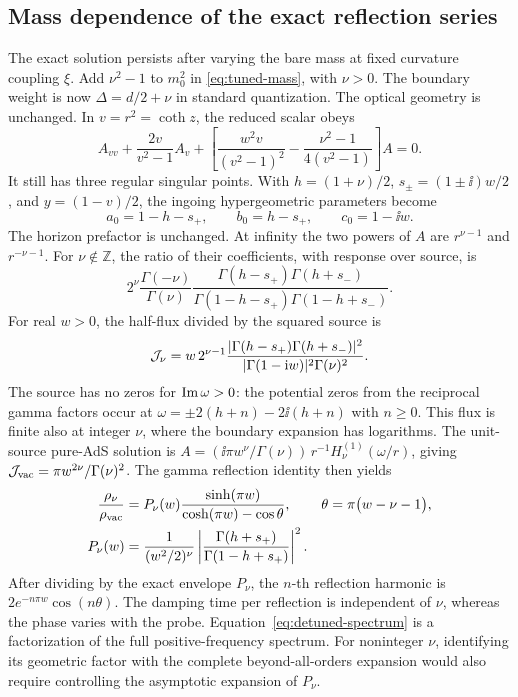 \subsection{Mass dependence of the exact reflection series}
\label{sec:detuning}

The exact solution persists after varying the bare mass at fixed curvature coupling \(\xi\). Add \(\nu^2-1\) to \(m_0^2\) in \eqref{eq:tuned-mass}, with \(\nu>0\). The boundary weight is now \(\Delta=d/2+\nu\) in standard quantization. The optical geometry is unchanged. In \(v=r^2=\coth z\), the reduced scalar obeys
\begin{equation}
 A_{vv}+\frac{2v}{v^2-1}A_v+
 \left[\frac{w^2 v}{(v^2-1)^2}-\frac{\nu^2-1}{4(v^2-1)}\right]A=0 .
 \label{eq:detune-v}
\end{equation}
It still has three regular singular points. With \(h=(1+\nu)/2\), \(s_\pm=(1\pm\ii)w/2\), and \(y=(1-v)/2\), the ingoing hypergeometric parameters become
\begin{equation}
 a_0=1-h-s_+,\qquad b_0=h-s_+,\qquad c_0=1-\ii w .
\end{equation}
The horizon prefactor is unchanged. At infinity the two powers of \(A\) are \(r^{\nu-1}\) and \(r^{-\nu-1}\). For \(\nu\notin\mathbb Z\), the ratio of their coefficients, with response over source, is
\begin{equation}
 2^\nu\frac{\Gamma(-\nu)}{\Gamma(\nu)}
 \frac{\Gamma(h-s_+)\Gamma(h+s_-)}
 {\Gamma(1-h-s_+)\Gamma(1-h+s_-)} .
 \label{eq:detuned-g}
\end{equation}
For real \(w>0\), the half-flux divided by the squared source is
\begin{equation}
 {\cal J}_\nu=
 w\,2^{\nu-1}
 \frac{|\Gamma(h-s_+)\Gamma(h+s_-)|^2}
      {|\Gamma(1-\mathrm{i} w)|^2\Gamma(\nu)^2}.
\end{equation}
The source has no zeros for \({\rm Im}\,\omega>0\): the potential zeros from the reciprocal gamma factors occur at \(\omega=\pm 2(h+n)-2\ii(h+n)\) with \(n\geq0\).
This flux is finite also at integer \(\nu\), where the boundary expansion has logarithms. The unit-source pure-AdS solution is \(A=(\ii\pi w^\nu/\Gamma(\nu))\,r^{-1}H^{(1)}_\nu(\omega/r)\), giving \({\cal J}_{\rm vac}=\pi w^{2\nu}/\Gamma(\nu)^2\). The gamma reflection identity then yields
\begin{align}
 \frac{\rho_\nu}{\rho_{\rm vac}}
 &=P_\nu(w)\frac{\sinh(\pi w)}{\cosh(\pi w)-\cos\theta},
 &\theta&=\pi\big(w-\nu-1\big),\notag\\
 P_\nu(w)
 &=\frac{1}{(w^2/2)^\nu}
     \left|\frac{\Gamma(h+s_+)}{\Gamma(1-h+s_+)}\right|^2.
 \label{eq:detuned-spectrum}
\end{align}
After dividing by the exact envelope \(P_\nu\), the \(n\)-th reflection harmonic is \(2e^{-n\pi w}\cos(n\theta)\). The damping time per reflection is independent of \(\nu\), whereas the phase varies with the probe. Equation~\eqref{eq:detuned-spectrum} is a factorization of the full positive-frequency spectrum. For noninteger \(\nu\), identifying its geometric factor with the complete beyond-all-orders expansion would also require controlling the asymptotic expansion of \(P_\nu\).

